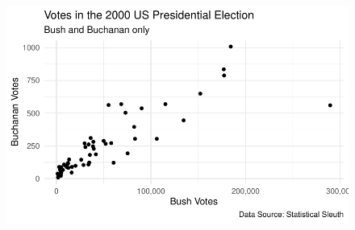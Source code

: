 \documentclass[
  letterpaper,
  DIV=11,
  numbers=noendperiod]{scrartcl}
\begin{document}
\begin{figure}[H]

{\centering \includegraphics{sds-291_s-24_case-study-template_files/figure-pdf/unnamed-chunk-12-1.pdf}

}

\end{figure}
\end{document}
